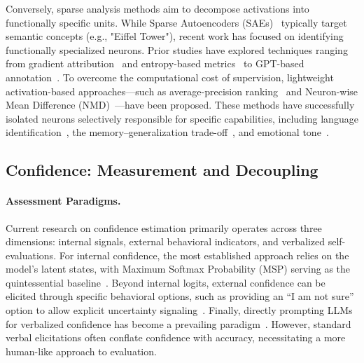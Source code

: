 \documentclass{article}
\begin{document}
Conversely, sparse analysis methods aim to decompose activations into functionally specific units. While Sparse Autoencoders (SAEs)~\cite{cunningham2023sparse, deng2025unveiling} typically target semantic concepts (e.g., "Eiffel Tower"), recent work has focused on identifying functionally specialized neurons. Prior studies have explored techniques ranging from gradient attribution~\cite{dai2022knowledge,31-aaai2025-identifying} and entropy-based metrics~\cite{22-acl2024-language} to GPT-based annotation~\cite{03-acl2024-investigation}. To overcome the computational cost of supervision, lightweight activation-based approaches—such as average-precision ranking~\cite{28-naacl2024-multilingual} and Neuron-wise Mean Difference (NMD)~\cite{10-ntu2024-think}—have been proposed. These methods have successfully isolated neurons selectively responsible for specific capabilities, including language identification~\cite{28-naacl2024-multilingual,22-acl2024-language}, the memory–generalization trade-off~\cite{10-ntu2024-think}, and emotional tone~\cite{21-2024-mysterious}.

\subsection{Confidence: Measurement and Decoupling} 
\label{sec:related_work_confidence}
\paragraph{Assessment Paradigms.} 
Current research on confidence estimation primarily operates across three dimensions: internal signals, external behavioral indicators, and verbalized self-evaluations. For internal confidence, the most established approach relies on the model's latent states, with Maximum Softmax Probability (MSP) serving as the quintessential baseline~\cite{paper1_baseline_msp,paper2_softmax_correctness}. Beyond internal logits, external confidence can be elicited through specific behavioral options, such as providing an ``I am not sure'' option to allow explicit uncertainty signaling~\cite{paper2_softmax_correctness}. Finally, directly prompting LLMs for verbalized confidence has become a prevailing paradigm~\cite{paper6_confidence_reasoning,paper4_confidence_alignment}. However, standard verbal elicitations often conflate confidence with accuracy, necessitating a more human-like approach to evaluation.
\end{document}
